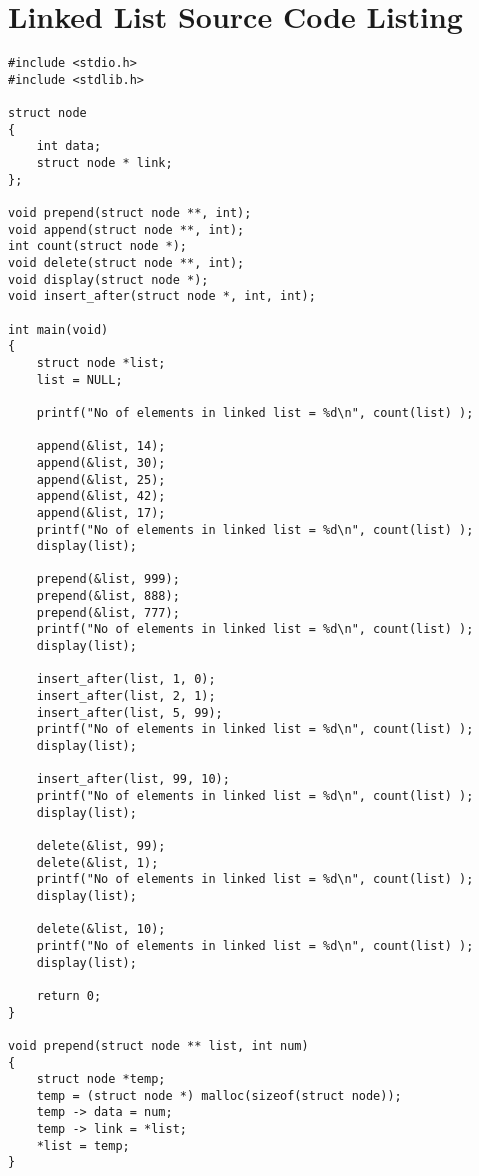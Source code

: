 \documentclass[10pt, a4paper, twosize]{article}
\begin{document}
\appendix

\section{Linked List Source Code Listing}
\label{linkedlist_listing}

\begin{lstlisting}
#include <stdio.h>
#include <stdlib.h>

struct node
{
    int data;
    struct node * link;
};

void prepend(struct node **, int);
void append(struct node **, int);
int count(struct node *);
void delete(struct node **, int);
void display(struct node *);
void insert_after(struct node *, int, int);

int main(void)
{
    struct node *list;
    list = NULL;
    
    printf("No of elements in linked list = %d\n", count(list) );

    append(&list, 14);
    append(&list, 30);
    append(&list, 25);
    append(&list, 42);
    append(&list, 17);
    printf("No of elements in linked list = %d\n", count(list) );
    display(list);

    prepend(&list, 999);
    prepend(&list, 888);
    prepend(&list, 777);
    printf("No of elements in linked list = %d\n", count(list) );
    display(list);

    insert_after(list, 1, 0);
    insert_after(list, 2, 1);
    insert_after(list, 5, 99);
    printf("No of elements in linked list = %d\n", count(list) );
    display(list);

    insert_after(list, 99, 10);
    printf("No of elements in linked list = %d\n", count(list) );
    display(list);

    delete(&list, 99);
    delete(&list, 1);
    printf("No of elements in linked list = %d\n", count(list) );
    display(list);

    delete(&list, 10);
    printf("No of elements in linked list = %d\n", count(list) );
    display(list);

    return 0;
}

void prepend(struct node ** list, int num)
{
    struct node *temp;
    temp = (struct node *) malloc(sizeof(struct node));
    temp -> data = num;
    temp -> link = *list;
    *list = temp;
}


\end{lstlisting}
\end{document}
